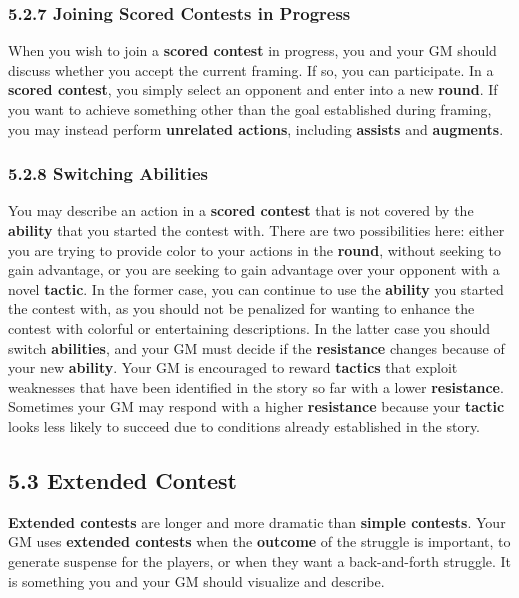 \documentclass[
]{article}
\begin{document}
\hypertarget{joining-scored-contests-in-progress}{%
\subsubsection{5.2.7 Joining Scored Contests in
Progress}\label{joining-scored-contests-in-progress}}

When you wish to join a \textbf{scored contest} in progress, you and
your GM should discuss whether you accept the current framing. If so,
you can participate. In a \textbf{scored contest}, you simply select an
opponent and enter into a new \textbf{round}. If you want to achieve
something other than the goal established during framing, you may
instead perform \textbf{unrelated actions}, including \textbf{assists}
and \textbf{augments}.

\hypertarget{switching-abilities}{%
\subsubsection{5.2.8 Switching Abilities}\label{switching-abilities}}

You may describe an action in a \textbf{scored contest} that is not
covered by the \textbf{ability} that you started the contest with. There
are two possibilities here: either you are trying to provide color to
your actions in the \textbf{round}, without seeking to gain advantage,
or you are seeking to gain advantage over your opponent with a novel
\textbf{tactic}. In the former case, you can continue to use the
\textbf{ability} you started the contest with, as you should not be
penalized for wanting to enhance the contest with colorful or
entertaining descriptions. In the latter case you should switch
\textbf{abilities}, and your GM must decide if the \textbf{resistance}
changes because of your new \textbf{ability}. Your GM is encouraged to
reward \textbf{tactics} that exploit weaknesses that have been
identified in the story so far with a lower \textbf{resistance}.
Sometimes your GM may respond with a higher \textbf{resistance} because
your \textbf{tactic} looks less likely to succeed due to conditions
already established in the story.

\hypertarget{extended-contest}{%
\subsection{5.3 Extended Contest}\label{extended-contest}}

\textbf{Extended contests} are longer and more dramatic than
\textbf{simple contests}. Your GM uses \textbf{extended contests} when
the \textbf{outcome} of the struggle is important, to generate suspense
for the players, or when they want a back-and-forth struggle. It is
something you and your GM should visualize and describe.
\end{document}
